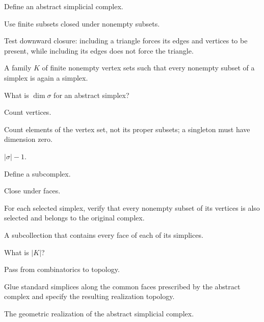 \begin{exercise}\label{exr:viii15-05}
Define an abstract simplicial complex.
\end{exercise}
\begin{hint}
Use finite subsets closed under nonempty subsets.

Test downward closure: including a triangle forces its edges and vertices to be present, while including its edges does not force the triangle.
\end{hint}
\begin{solution}
A family \(K\) of finite nonempty vertex sets such that every nonempty subset of a simplex is again a simplex.
\end{solution}

\begin{exercise}\label{exr:viii15-06}
What is \(\dim\sigma\) for an abstract simplex?
\end{exercise}
\begin{hint}
Count vertices.

Count elements of the vertex set, not its proper subsets; a singleton must have dimension zero.
\end{hint}
\begin{solution}
\(|\sigma|-1\).
\end{solution}

\begin{exercise}\label{exr:viii15-07}
Define a subcomplex.
\end{exercise}
\begin{hint}
Close under faces.

For each selected simplex, verify that every nonempty subset of its vertices is also selected and belongs to the original complex.
\end{hint}
\begin{solution}
A subcollection that contains every face of each of its simplices.
\end{solution}

\begin{exercise}\label{exr:viii15-08}
What is \(|K|\)?
\end{exercise}
\begin{hint}
Pass from combinatorics to topology.

Glue standard simplices along the common faces prescribed by the abstract complex and specify the resulting realization topology.
\end{hint}
\begin{solution}
The geometric realization of the abstract simplicial complex.
\end{solution}

